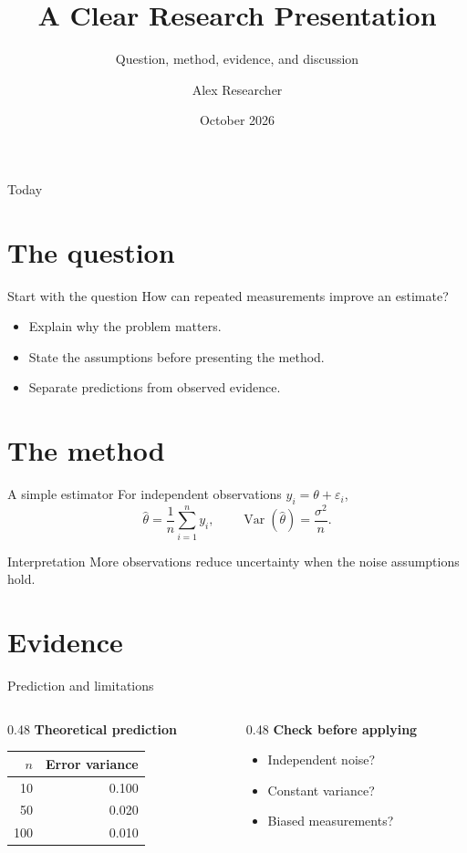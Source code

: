 \documentclass[aspectratio=169]{beamer}
\title{A Clear Research Presentation}
\subtitle{Question, method, evidence, and discussion}
\author{Alex Researcher}
\institute{Example University}
\date{October 2026}
\begin{document}
\begin{frame}\titlepage\end{frame}
\begin{frame}{Today}\tableofcontents\end{frame}
\section{The question}
\begin{frame}{Start with the question}
How can repeated measurements improve an estimate?
\begin{itemize}
\item Explain why the problem matters.
\item State the assumptions before presenting the method.
\item Separate predictions from observed evidence.
\end{itemize}
\end{frame}
\section{The method}
\begin{frame}{A simple estimator}
For independent observations $y_i=\theta+\varepsilon_i$,
\[
\widehat\theta=\frac{1}{n}\sum_{i=1}^n y_i,
\qquad \operatorname{Var}(\widehat\theta)=\frac{\sigma^2}{n}.
\]
\begin{block}{Interpretation}
More observations reduce uncertainty when the noise assumptions hold.
\end{block}
\end{frame}
\section{Evidence}
\begin{frame}{Prediction and limitations}
\begin{columns}[T]
\begin{column}{0.48\textwidth}
\textbf{Theoretical prediction}
\begin{center}\begin{tabular}{rr}\toprule
$n$ & Error variance \\\midrule
10 & 0.100 \\50 & 0.020 \\100 & 0.010 \\\bottomrule
\end{tabular}\end{center}
\end{column}
\begin{column}{0.48\textwidth}
\textbf{Check before applying}
\begin{itemize}\item Independent noise?\item Constant variance?\item Biased measurements?\end{itemize}
\end{column}
\end{columns}
\end{frame}
\end{document}
